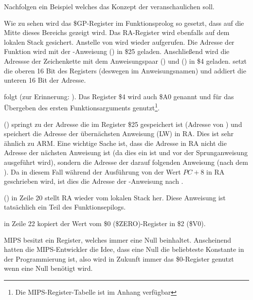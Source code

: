 Nachfolgen ein Beispiel welches das Konzept der  veranschaulichen soll.



Wie zu sehen wird das \$GP-Register im Funktionsprolog so gesetzt, dass auf die Mitte
dieses Bereichs gezeigt wird.
Das \ac{RA}-Register wird ebenfalls auf dem lokalen Stack gesichert.
Anstelle von \printf wird wieder \puts aufgerufen.
Die Adresse der Funktion \puts wird mit der -Anweisung () in \$25 geladen.
Anschließend wird die Adressse der Zeichenkette mit dem Anweisungspaar  ()
und  () in \$4 geladen.
 setzt die  oberen 16 Bit des Registers (deswegen  im Anweisungsnamen)
und  addiert die unteren 16 Bit der Adresse.

 folgt  (zur Erinnerung: ).
Das Register \$4 wird auch \$A0 genannt und für das Übergeben des ersten Funktionsarguments
genutzt\footnote{Die MIPS-Register-Tabelle ist im Anhang verfügbar }.


 () springt zu der Adresse die im Register \$25
gespeichert ist (Adresse von \puts) und speichert die Adresse der übernächsten Anweisung
(LW) in \ac{RA}. Dies ist sehr ähnlich zu ARM.
Eine wichtige Sache ist, dass die Adresse in \ac{RA} nicht die Adresse der nächsten
Anweisung ist (da dies ein  ist und vor der Sprunganweisung ausgeführt wird),
sondern die Adresse der darauf folgenden Anweisung (nach dem ).
Da in diesem Fall während der Ausführung von  der Wert $PC + 8$ in \ac{RA}
geschrieben wird, ist dies die Adresse der -Anweisung nach .

 () in Zeile 20 stellt \ac{RA} wieder vom lokalen Stack her.
Diese Anweisung ist tatsächlich ein Teil des Funktionsepilogs.


 in Zeile 22 kopiert der Wert vom \$0 (\$ZERO)-Register in \$2 (\$V0).
\label{MIPS_zero_register}

MIPS besitzt ein  Register, welches immer eine Null beinhaltet.
Anscheinend hatten die MIPS-Entwickler die Idee, dass eine Null die beliebteste
Konstante in der Programmierung ist, also wird in Zukunft immer das \$0-Register
genutzt wenn eine Null benötigt wird.

